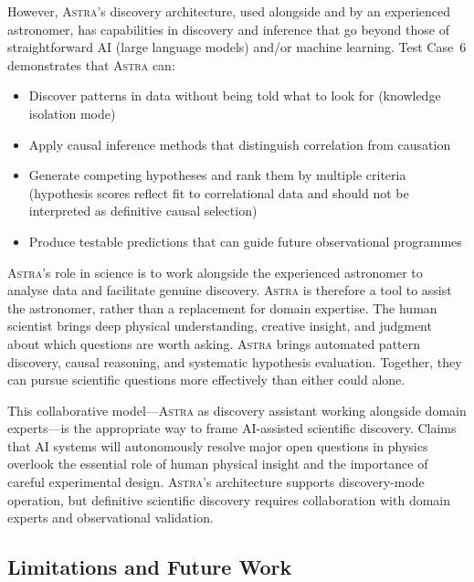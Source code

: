 \documentclass[fleqn,usenatbib]{mnras}
\newcommand{\astra}{\textsc{Astra}\xspace}
\begin{document}
However, \astra's discovery architecture, used alongside and by an experienced astronomer, has capabilities in discovery and inference that go beyond those of straightforward AI (large language models) and/or machine learning.
Test Case~6 demonstrates that \astra can:
\begin{itemize}
  \item Discover patterns in data without being told what to look for (knowledge isolation mode)
  \item Apply causal inference methods that distinguish correlation from causation
  \item Generate competing hypotheses and rank them by multiple criteria (hypothesis scores reflect fit to correlational data and should not be interpreted as definitive causal selection)
  \item Produce testable predictions that can guide future observational programmes
\end{itemize}

\astra's role in science is to work alongside the experienced astronomer to analyse data and facilitate genuine discovery.
\astra is therefore a tool to assist the astronomer, rather than a replacement for domain expertise.
The human scientist brings deep physical understanding, creative insight, and judgment about which questions are worth asking.
\astra brings automated pattern discovery, causal reasoning, and systematic hypothesis evaluation.
Together, they can pursue scientific questions more effectively than either could alone.

This collaborative model---\astra as discovery assistant working alongside domain experts---is the appropriate way to frame AI-assisted scientific discovery.
Claims that AI systems will autonomously resolve major open questions in physics overlook the essential role of human physical insight and the importance of careful experimental design.
\astra's architecture supports discovery-mode operation, but definitive scientific discovery requires collaboration with domain experts and observational validation.

\subsection{Limitations and Future Work}
\label{sec:discussion:limitations}
\end{document}
